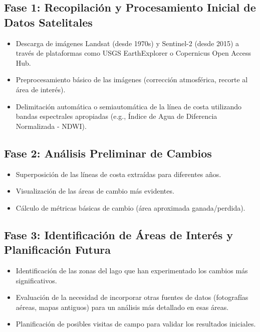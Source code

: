 \documentclass{article}
\begin{document}
\subsection*{Fase 1: Recopilación y Procesamiento Inicial de Datos Satelitales}

\begin{itemize}
    \item Descarga de imágenes Landsat (desde 1970s) y Sentinel-2 (desde 2015) a través de plataformas como USGS EarthExplorer o Copernicus Open Access Hub.
    \item Preprocesamiento básico de las imágenes (corrección atmosférica, recorte al área de interés).
    \item Delimitación automática o semiautomática de la línea de costa utilizando bandas espectrales apropiadas (e.g., Índice de Agua de Diferencia Normalizada - NDWI).
\end{itemize}

\subsection*{Fase 2: Análisis Preliminar de Cambios}

\begin{itemize}
    \item Superposición de las líneas de costa extraídas para diferentes años.
    \item Visualización de las áreas de cambio más evidentes.
    \item Cálculo de métricas básicas de cambio (área aproximada ganada/perdida).
\end{itemize}

\subsection*{Fase 3: Identificación de Áreas de Interés y Planificación Futura}

\begin{itemize}
    \item Identificación de las zonas del lago que han experimentado los cambios más significativos.
    \item Evaluación de la necesidad de incorporar otras fuentes de datos (fotografías aéreas, mapas antiguos) para un análisis más detallado en esas áreas.
    \item Planificación de posibles visitas de campo para validar los resultados iniciales.
\end{itemize}
\end{document}
